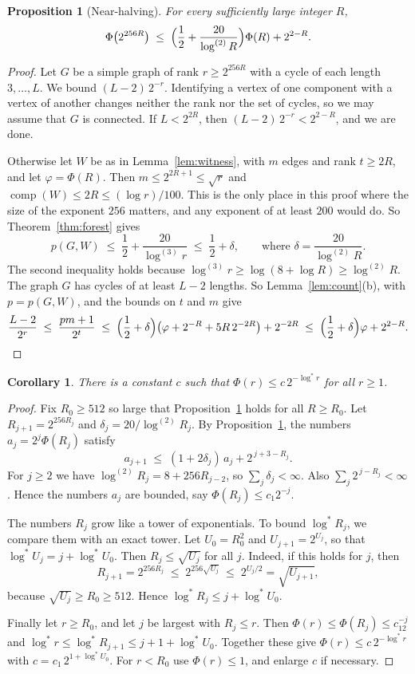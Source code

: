 \documentclass[11pt]{article}
\newtheorem{proposition}[theorem]{Proposition}
\newtheorem{corollary}[theorem]{Corollary}
\theoremstyle{definition}
\theoremstyle{remark}
\newcommand{\comp}{\operatorname{comp}}
\newcommand{\lgs}{\log^{*}}
\newcommand{\lgk}[1]{\log^{(#1)}}
\numberwithin{equation}{section}
\begin{document}
\begin{proposition}[Near-halving]\label{prop:halving}
For every sufficiently large integer $R$,
\[
  \Phi\bigl(2^{256R}\bigr)\;\le\;\Bigl(\frac12+\frac{20}{\lgk{2}R}\Bigr)\Phi(R)+2^{2-R}.
\]
\end{proposition}

\begin{proof}
Let $G$ be a simple graph of rank $r\ge2^{256R}$ with a cycle of each length $3,\dots,L$. We bound
$(L-2)\,2^{-r}$. Identifying a vertex of one component with a vertex of another changes neither the
rank nor the set of cycles, so we may assume that $G$ is connected. If $L<2^{2R}$, then
$(L-2)\,2^{-r}<2^{2-R}$, and we are done.

Otherwise let $W$ be as in Lemma~\ref{lem:witness}, with $m$ edges and rank $t\ge2R$, and let
$\varphi=\Phi(R)$. Then $m\le2^{2R+1}\le\sqrt r$ and $\comp(W)\le2R\le(\log r)/100$. This is
the only place in this proof where the size of the exponent $256$ matters, and any exponent of at
least $200$ would do.
So Theorem~\ref{thm:forest} gives
\[
  p(G,W)\;\le\;\frac12+\frac{20}{\lgk3r}\;\le\;\frac12+\delta,
  \qquad\text{where }\delta=\frac{20}{\lgk2R}.
\]
The second inequality holds because $\lgk3r\ge\log(8+\log R)\ge\lgk2R$. The graph $G$ has cycles of
at least $L-2$ lengths. So Lemma~\ref{lem:count}(b), with $p=p(G,W)$, and the bounds on $t$ and $m$
give
\[
  \frac{L-2}{2^{r}}\;\le\;\frac{pm+1}{2^{t}}
  \;\le\;\Bigl(\frac12+\delta\Bigr)\bigl(\varphi+2^{-R}+5R\,2^{-2R}\bigr)+2^{-2R}
  \;\le\;\Bigl(\frac12+\delta\Bigr)\varphi+2^{2-R}.\qedhere
\]
\end{proof}

\begin{corollary}\label{cor:phi}
There is a constant $c$ such that $\Phi(r)\le c\,2^{-\lgs r}$ for all $r\ge1$.
\end{corollary}

\begin{proof}
Fix $R_0\ge512$ so large that Proposition~\ref{prop:halving} holds for all $R\ge R_0$. Let
$R_{j+1}=2^{256R_j}$ and $\delta_j=20/\lgk2R_j$. By Proposition~\ref{prop:halving}, the numbers
$a_j=2^{j}\Phi(R_j)$ satisfy
\[
  a_{j+1}\;\le\;(1+2\delta_j)\,a_j+2^{\,j+3-R_j}.
\]
For $j\ge2$ we have $\lgk2R_j=8+256R_{j-2}$, so $\sum_j\delta_j<\infty$. Also
$\sum_j2^{\,j-R_j}<\infty$. Hence the numbers $a_j$ are bounded, say $\Phi(R_j)\le c_1 2^{-j}$.

The numbers $R_j$ grow like a tower of exponentials. To bound $\lgs R_j$, we compare them with an
exact tower. Let $U_0=R_0^2$ and $U_{j+1}=2^{U_j}$, so that $\lgs U_j=j+\lgs U_0$. Then
$R_j\le\sqrt{U_j}$ for all $j$. Indeed, if this holds for $j$, then
\[
  R_{j+1}=2^{256R_j}\;\le\;2^{256\sqrt{U_j}}\;\le\;2^{U_j/2}=\sqrt{U_{j+1}},
\]
because $\sqrt{U_j}\ge R_0\ge512$. Hence $\lgs R_j\le j+\lgs U_0$.

Finally let $r\ge R_0$, and let $j$ be largest with $R_j\le r$. Then
$\Phi(r)\le\Phi(R_j)\le c_12^{-j}$ and $\lgs r\le\lgs R_{j+1}\le j+1+\lgs U_0$. Together these give
$\Phi(r)\le c\,2^{-\lgs r}$ with $c=c_1\,2^{1+\lgs U_0}$. For $r<R_0$ use $\Phi(r)\le1$, and enlarge
$c$ if necessary.
\end{proof}
\end{document}
